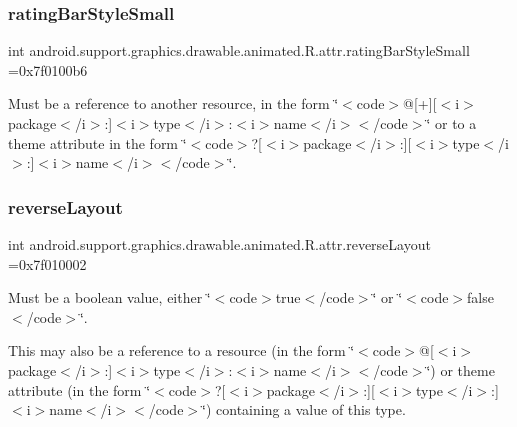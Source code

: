 \subsubsection{\texorpdfstring{rating\+Bar\+Style\+Small}{ratingBarStyleSmall}}
{\footnotesize\ttfamily int android.\+support.\+graphics.\+drawable.\+animated.\+R.\+attr.\+rating\+Bar\+Style\+Small =0x7f0100b6\hspace{0.3cm}{\ttfamily [static]}}

Must be a reference to another resource, in the form \char`\"{}$<$code$>$@\mbox{[}+\mbox{]}\mbox{[}$<$i$>$package$<$/i$>$\+:\mbox{]}$<$i$>$type$<$/i$>$\+:$<$i$>$name$<$/i$>$$<$/code$>$\char`\"{} or to a theme attribute in the form \char`\"{}$<$code$>$?\mbox{[}$<$i$>$package$<$/i$>$\+:\mbox{]}\mbox{[}$<$i$>$type$<$/i$>$\+:\mbox{]}$<$i$>$name$<$/i$>$$<$/code$>$\char`\"{}. \mbox{\label{classandroid_1_1support_1_1graphics_1_1drawable_1_1animated_1_1R_1_1attr_a08e28355209f9e2acee1a23a9474beb7}} 
\subsubsection{\texorpdfstring{reverse\+Layout}{reverseLayout}}
{\footnotesize\ttfamily int android.\+support.\+graphics.\+drawable.\+animated.\+R.\+attr.\+reverse\+Layout =0x7f010002\hspace{0.3cm}{\ttfamily [static]}}

Must be a boolean value, either \char`\"{}$<$code$>$true$<$/code$>$\char`\"{} or \char`\"{}$<$code$>$false$<$/code$>$\char`\"{}. 

This may also be a reference to a resource (in the form \char`\"{}$<$code$>$@\mbox{[}$<$i$>$package$<$/i$>$\+:\mbox{]}$<$i$>$type$<$/i$>$\+:$<$i$>$name$<$/i$>$$<$/code$>$\char`\"{}) or theme attribute (in the form \char`\"{}$<$code$>$?\mbox{[}$<$i$>$package$<$/i$>$\+:\mbox{]}\mbox{[}$<$i$>$type$<$/i$>$\+:\mbox{]}$<$i$>$name$<$/i$>$$<$/code$>$\char`\"{}) containing a value of this type. \mbox{\label{classandroid_1_1support_1_1graphics_1_1drawable_1_1animated_1_1R_1_1attr_a7f3d5ddc3c625795d695d54870ec4b82}} 
